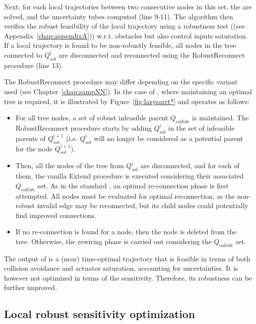 Next, for each local trajectories between two consecutive nodes in this set, the  are solved, and the uncertainty tubes computed (line 9-11).
The algorithm then verifies the robust feasibility of the local trajectory using a robustness test ((see Appendix~\ref{chap:appendixA})) w.r.t. obstacles but also control inputs saturation. 
If a local trajectory is found to be non-robustly feasible, all nodes in the tree connected to $Q_{sol}^i$ are disconnected and reconnected using the RobustReconnect procedure (line 13).

The RobustReconnect procedure may differ depending on the specific  variant used (see Chapter~\ref{chap:sampNN}). 
In the case of , where maintaining an optimal tree is required, it is illustrated by Figure~\ref{fig:lazysarrt*} and operates as follows:
\begin{itemize}
    \item For all tree nodes, a set of robust infeasible parent $Q_{collide}$ is maintained. 
    The RobustReconnect procedure starts by adding $Q_{sol}^i$ in the set of infeasible parents of $Q_{sol}^{i+1}$ (i.e. $Q_{sol}^i$ will no longer be considered as a potential parent for the node $Q_{sol}^{i+1}$).
    \item Then, all the nodes of the tree from $Q_{sol}^i$ are disconnected, and for each of them, the vanilla Extend procedure is executed considering their associated $Q_{collide}$ set.
    As in the standard , an optimal re-connection phase is first attempted.
    All nodes must be evaluated for optimal reconnection, as the non-robust invalid edge may be reconnected, but its child nodes could potentially find improved connections.
    \item If no re-connection is found for a node, then the node is deleted from the tree. 
    Otherwise, the rewiring phase is carried out considering the $Q_{collide}$ set.
\end{itemize}

The output of  is a (near) time-optimal trajectory that is feasible in terms of both collision avoidance and actuator saturation, accounting for uncertainties.
It is however not optimized in terms of the sensitivity. 
Therefore, its robustness can be further improved.

\subsection{Local robust sensitivity optimization}

